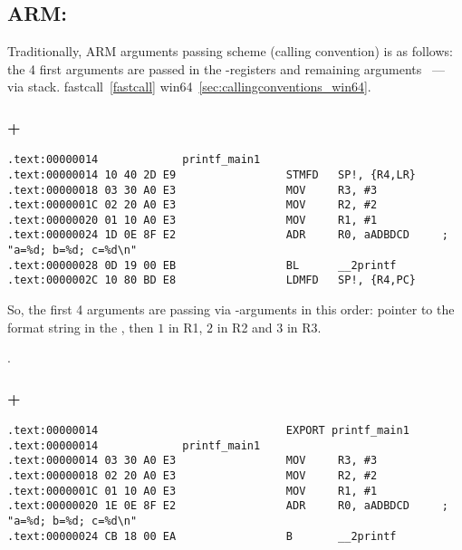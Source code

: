 ﻿\subsection{ARM: }

{Traditionally, ARM arguments passing scheme (calling convention) is as follows:
the 4 first arguments are passed in the \Rzero-\Rthree registers and remaining arguments ~--- via stack}.
fastcall~\ref{fastcall}  win64~\ref{sec:callingconventions_win64}.

\subsubsection{\NonOptimizingKeil + \ARMMode}

\begin{lstlisting}[caption=\NonOptimizingKeil + \ARMMode]
.text:00000014             printf_main1
.text:00000014 10 40 2D E9                 STMFD   SP!, {R4,LR}
.text:00000018 03 30 A0 E3                 MOV     R3, #3
.text:0000001C 02 20 A0 E3                 MOV     R2, #2
.text:00000020 01 10 A0 E3                 MOV     R1, #1
.text:00000024 1D 0E 8F E2                 ADR     R0, aADBDCD     ; "a=%d; b=%d; c=%d\n"
.text:00000028 0D 19 00 EB                 BL      __2printf
.text:0000002C 10 80 BD E8                 LDMFD   SP!, {R4,PC}
\end{lstlisting}

{So, the first 4 arguments are passing via \Rzero-\Rzero arguments in this order:
pointer to the \printf format string in the \Rzero, then $1$ in R1, $2$ in R2 and $3$ in R3}.

.

\subsubsection{\OptimizingKeil + \ARMMode}
\label{ARM_B_to_printf}

\begin{lstlisting}[caption=\OptimizingKeil + \ARMMode]
.text:00000014                             EXPORT printf_main1
.text:00000014             printf_main1
.text:00000014 03 30 A0 E3                 MOV     R3, #3
.text:00000018 02 20 A0 E3                 MOV     R2, #2
.text:0000001C 01 10 A0 E3                 MOV     R1, #1
.text:00000020 1E 0E 8F E2                 ADR     R0, aADBDCD     ; "a=%d; b=%d; c=%d\n"
.text:00000024 CB 18 00 EA                 B       __2printf
\end{lstlisting}


